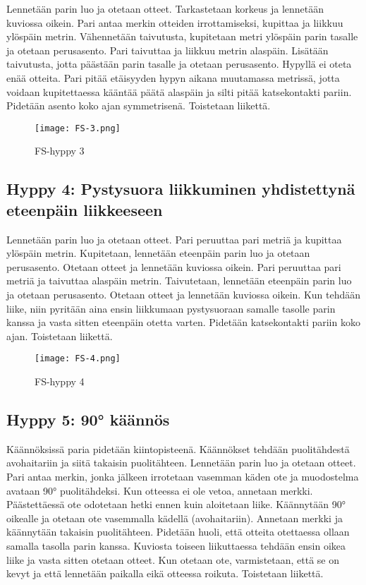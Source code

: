 Lennetään parin luo ja otetaan otteet. Tarkastetaan korkeus ja lennetään kuviossa oikein. Pari antaa merkin otteiden irrottamiseksi, kupittaa ja liikkuu ylöspäin metrin. Vähennetään taivutusta, kupitetaan metri ylöspäin parin tasalle ja otetaan perusasento. Pari taivuttaa ja liikkuu metrin alaspäin. Lisätään taivutusta, jotta päästään parin tasalle ja otetaan perusasento. Hypyllä ei oteta enää otteita. Pari pitää etäisyyden hypyn aikana muutamassa metrissä, jotta voidaan kupitettaessa kääntää päätä alaspäin ja silti pitää katsekontakti pariin. Pidetään asento koko ajan symmetrisenä. Toistetaan liikettä. 


\begin{figure*}[]\centering\texttt{[image: FS-3.png]}\caption{FS-hyppy 3}\end{figure*} 

\subsection{ Hyppy 4: Pystysuora liikkuminen yhdistettynä eteenpäin liikkeeseen }
\label{fs-kuviohyppaaminen-hyppy-4-pystysuora-liikkuminen-yhdistettyna-eteenpain-liikkeeseen}


Lennetään parin luo ja otetaan otteet. Pari peruuttaa pari metriä ja kupittaa ylöspäin metrin. Kupitetaan, lennetään eteenpäin parin luo ja otetaan perusasento. Otetaan otteet ja lennetään kuviossa oikein. Pari peruuttaa pari metriä ja taivuttaa alaspäin metrin. Taivutetaan, lennetään eteenpäin parin luo ja otetaan perusasento. Otetaan otteet ja lennetään kuviossa oikein. Kun tehdään liike, niin pyritään aina ensin liikkumaan pystysuoraan samalle tasolle parin kanssa ja vasta sitten eteenpäin otetta varten. Pidetään katsekontakti pariin koko ajan. Toistetaan liikettä. 


\begin{figure*}[]\centering\texttt{[image: FS-4.png]}\caption{FS-hyppy 4}\end{figure*} 

\subsection{ Hyppy 5: 90° käännös }
\label{fs-kuviohyppaaminen-hyppy-5-90deg-kaannos}


Käännöksissä paria pidetään kiintopisteenä. Käännökset tehdään puolitähdestä avohaitariin ja siitä takaisin puolitähteen. Lennetään parin luo ja otetaan otteet. Pari antaa merkin, jonka jälkeen irrotetaan vasemman käden ote ja muodostelma avataan 90° puolitähdeksi. Kun otteessa ei ole vetoa, annetaan merkki. Päästettäessä ote odotetaan hetki ennen kuin aloitetaan liike. Käännytään 90° oikealle ja otetaan ote vasemmalla kädellä (avohaitariin). Annetaan merkki ja käännytään takaisin puolitähteen. Pidetään huoli, että otteita otettaessa ollaan samalla tasolla parin kanssa. Kuviosta toiseen liikuttaessa tehdään ensin oikea liike ja vasta sitten otetaan otteet. Kun otetaan ote, varmistetaan, että se on kevyt ja että lennetään paikalla eikä otteessa roikuta. Toistetaan liikettä. 


